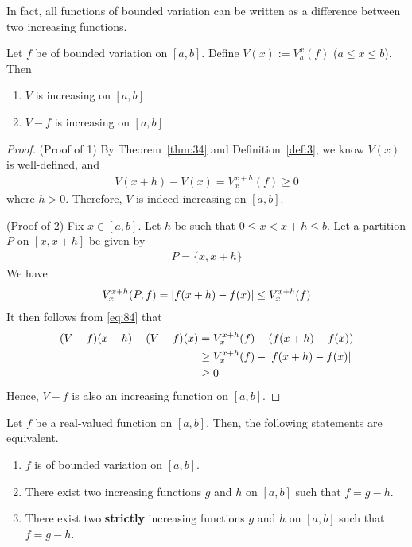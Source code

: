 \documentclass[thmcnt=section, 12pt]{my-elegantbook}
\begin{document}
In fact, all functions of bounded variation can be written as a difference between two increasing functions.


\begin{lemma} \label{lem:2}
    Let $f$ be of bounded variation on $[a, b]$. Define $V(x) := V_a^x(f)$ ($a \leq x \leq b$). Then 
    \begin{enumerate}
        \item $V$ is increasing on $[a, b]$
        \item $V-f$ is increasing on $[a, b]$
    \end{enumerate}
\end{lemma}

\begin{proof}
    (Proof of 1) By Theorem~\ref{thm:34} and Definition~\ref{def:3}, we know $V(x)$ is well-defined, and 
    \begin{align*}
        V(x+h) - V(x) = V_x^{x+h}(f) \geq 0
    \end{align*}
    where $h > 0$. Therefore, $V$ is indeed increasing on $[a, b]$.

    (Proof of 2) Fix $x \in [a, b]$. Let $h$ be such that $0 \leq x < x+h \leq b$. Let a partition $P$ on $[x, x+h]$ be given by 
    \begin{align*}
        P = \{ x, x+h \}
    \end{align*}
    We have 
    \begin{align}
        V_x^{x+h}(P, f) = \left\lvert f(x+h) - f(x) \right\rvert 
        \leq V_x^{x+h}(f)
        \label{eq:84}
    \end{align}
    It then follows from \eqref{eq:84} that 
    \begin{align*}
        (V-f)(x+h) - (V-f)(x)
        &= V_x^{x+h}(f) - (f(x+h) - f(x)) \\ 
        &\geq V_x^{x+h}(f) - \left\lvert f(x+h) - f(x) \right\rvert \\ 
        &\geq 0
    \end{align*}
    Hence, $V-f$ is also an increasing function on $[a, b]$.
\end{proof}


\begin{theorem} \label{thm:22}
    Let $f$ be a real-valued function on $[a, b]$. Then, the following statements are equivalent.
    \begin{enumerate}
        \item $f$ is of bounded variation on $[a, b]$.
        \item There exist two increasing functions $g$ and $h$ on $[a, b]$ such that $f = g - h$.
        \item There exist two \textbf{strictly} increasing functions $g$ and $h$ on $[a, b]$ such that $f = g - h$.
    \end{enumerate}
\end{theorem}
\end{document}
